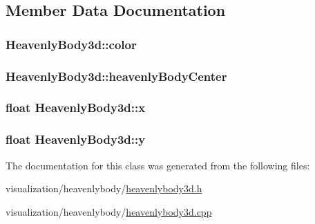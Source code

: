 \subsection{\-Member \-Data \-Documentation}
\hypertarget{classHeavenlyBody3d_a2ebcfe6746f12921e1ef0c9bfeb4a9cb}{
\subsubsection[{color}]{ {\bf \-Heavenly\-Body3d\-::color}}}
\label{db/d73/classHeavenlyBody3d_a2ebcfe6746f12921e1ef0c9bfeb4a9cb}
\hypertarget{classHeavenlyBody3d_a3fa03680a708c4c58d4db74b8fdf58fb}{
\subsubsection[{heavenly\-Body\-Center}]{ {\bf \-Heavenly\-Body3d\-::heavenly\-Body\-Center}}}
\label{db/d73/classHeavenlyBody3d_a3fa03680a708c4c58d4db74b8fdf58fb}
\hypertarget{classHeavenlyBody3d_a287510419f9dd9019fbfd56154c15f75}{
\subsubsection[{x}]{\setlength{\rightskip}{0pt plus 5cm}float {\bf \-Heavenly\-Body3d\-::x}}}
\label{db/d73/classHeavenlyBody3d_a287510419f9dd9019fbfd56154c15f75}
\hypertarget{classHeavenlyBody3d_a219f2f76157b162a89a4bbdbec72dbff}{
\subsubsection[{y}]{\setlength{\rightskip}{0pt plus 5cm}float {\bf \-Heavenly\-Body3d\-::y}}}
\label{db/d73/classHeavenlyBody3d_a219f2f76157b162a89a4bbdbec72dbff}


\-The documentation for this class was generated from the following files\-:\begin{DoxyCompactItemize}
\item 
visualization/heavenlybody/\hyperlink{heavenlybody3d_8h}{heavenlybody3d.\-h}\item 
visualization/heavenlybody/\hyperlink{heavenlybody3d_8cpp}{heavenlybody3d.\-cpp}\end{DoxyCompactItemize}
